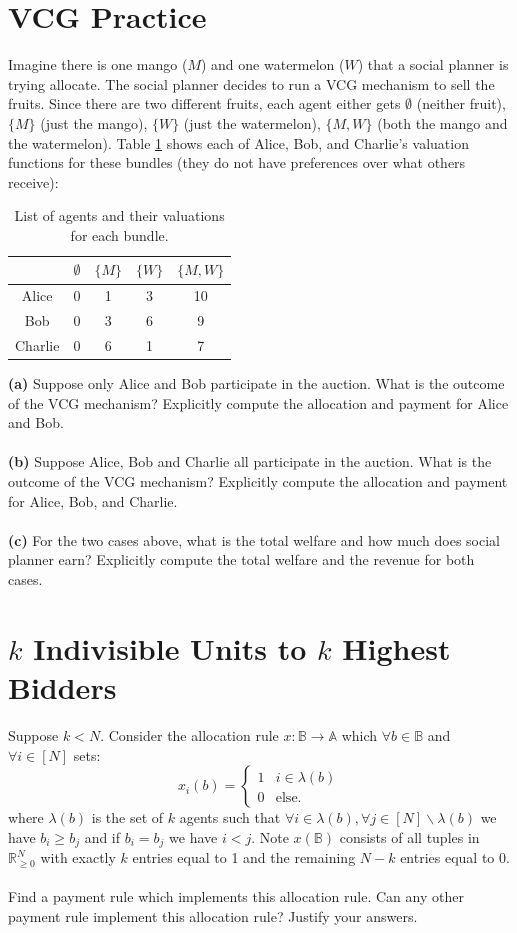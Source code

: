 \documentclass[11pt]{article}
\title{}
\date{}
\theoremstyle{definition}
\theoremstyle{plain}
\begin{document}
\section{VCG Practice}
Imagine there is one mango ($M$) and one watermelon ($W$) that a social planner is trying allocate. The social planner decides to run a VCG mechanism to sell the fruits. Since there are two different fruits, each agent either gets $\emptyset$ (neither fruit), $\{M\}$ (just the mango), $\{W\}$ (just the watermelon), $\{M,W\}$ (both the mango and the watermelon). Table \ref{tab:valuations} shows each of Alice, Bob, and Charlie's valuation functions for these bundles (they do not have preferences over what others receive):

\begin{table}[h]
\centering
\begin{tabular}{|c|c|c|c|c|}
\hline
 & $\emptyset$ & $\{M\}$ & $\{W\}$ & $\{M,W\}$ \\
\hline
Alice   & 0 & 1 & 3 & 10 \\
\hline
Bob     & 0 & 3 & 6 & 9 \\
\hline
Charlie & 0 & 6 & 1 & 7 \\
\hline
\end{tabular}
\caption{List of agents and their valuations for each bundle.}
\label{tab:valuations}
\end{table}

\noindent \textbf{(a)} Suppose only Alice and Bob participate in the auction. What is the outcome of the VCG mechanism? Explicitly compute the allocation and payment for Alice and Bob.
\\
\\
\noindent \textbf{(b)} Suppose Alice, Bob and Charlie all participate in the auction. What is the outcome of the VCG mechanism? Explicitly compute the allocation and payment for Alice, Bob, and Charlie.
\\
\\
\noindent \textbf{(c)} For the two cases above, what is the total welfare and how much does social planner earn? Explicitly compute the total welfare and the revenue for both cases. 



\section{$k$ Indivisible Units to $k$ Highest Bidders}
Suppose $k< N$. Consider the allocation rule $x:\mathbb{B} \to \mathbb{A}$ which $
\forall b \in \mathbb{B}$ and $\forall i \in [N]$ sets:
$$x_i(b)=\begin{cases}1 & i \in \lambda(b) \\ 0 & \text{else}. \end{cases}$$
where $\lambda(b)$ is the set of $k$ agents such that $\forall i \in \lambda(b),
\forall j \in [N] \backslash \lambda(b)$ we have $b_i \geq b_j$ and if $b_i=b_j$ we
have $i < j$. Note $x(\mathbb{B})$ consists of all tuples in $\mathbb{R}^N_{\geq
0}$ with exactly $k$ entries equal to 1 and the remaining $N-k$ entries equal to
$0$. 
\\
\\
Find a payment rule which implements this allocation rule. Can any other payment rule implement this allocation rule? Justify your answers.
\end{document}
